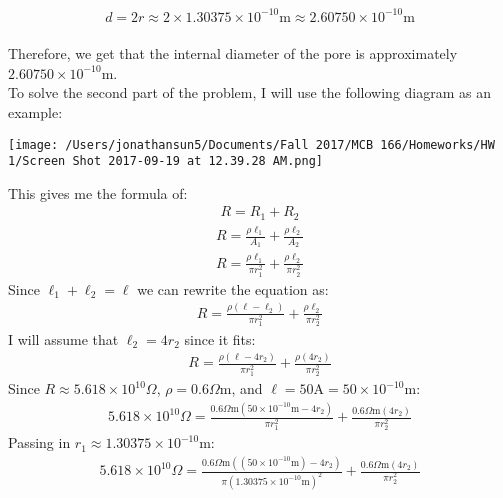 \documentclass[11pt]{article}
\begin{document}
\begin{enumerate}[label=\arabic*.]
\begin{align*}
d = 2r \approx 2 \times 1.30375 \times 10^{-10} \text{m} \approx 2.60750 \times 10^{-10} \text{m}
\end{align*}
\vspace*{1\baselineskip}
\\
Therefore, we get that the internal diameter of the pore is approximately $2.60750 \times 10^{-10} \text{m}$.
\vspace*{1\baselineskip}
\\
To solve the second part of the problem, I will use the following diagram as an example:
\begin{center}
\texttt{[image: /Users/jonathansun5/Documents/Fall 2017/MCB 166/Homeworks/HW 1/Screen Shot 2017-09-19 at 12.39.28 AM.png]}
\end{center}
This gives me the formula of:
\begin{align*}
R = R_1 + R_2
\end{align*}
\begin{align*}
R = \frac{\rho \ell_1} {A_1} + \frac{\rho \ell_2} {A_2}
\end{align*}
\begin{align*}
R = \frac{\rho \ell_1} {\pi r_1^2} + \frac{\rho \ell_2} {\pi r_2^2}
\end{align*}
Since $\ell_1 + \ell_2 = \ell$ we can rewrite the equation as:
\begin{align*}
R = \frac{\rho \left(\ell - \ell_2\right)} {\pi r_1^2} + \frac{\rho \ell_2} {\pi r_2^2}
\end{align*}
I will assume that $\ell_2 = 4r_2$ since it fits:
\begin{align*}
R = \frac{\rho \left(\ell - 4r_2\right)} {\pi r_1^2} + \frac{\rho \left(4r_2\right)} {\pi r_2^2}
\end{align*}
Since $R \approx 5.618 \times 10^{10} \Omega$, $\rho = 0.6 \Omega \text{m}$, and $\ell = 50 \text{A} = 50 \times 10^{-10} \text{m}$:
\begin{align*}
5.618 \times 10^{10} \Omega = \frac{0.6 \Omega \text{m} \left(50 \times 10^{-10} \text{m} - 4r_2\right)} {\pi r_1^2} + \frac{0.6 \Omega \text{m} \left(4r_2\right)} {\pi r_2^2}
\end{align*}
Passing in $r_1 \approx 1.30375 \times 10^{-10} \text{m}$:
\begin{align*}
5.618 \times 10^{10} \Omega = \frac{0.6 \Omega \text{m} \left((50 \times 10^{-10} \text{m}) - 4r_2\right)} {\pi (1.30375 \times 10^{-10} \text{m})^2} + \frac{0.6 \Omega \text{m} \left(4r_2\right)} {\pi r_2^2}

\end{align*}
\end{enumerate}
\end{document}
